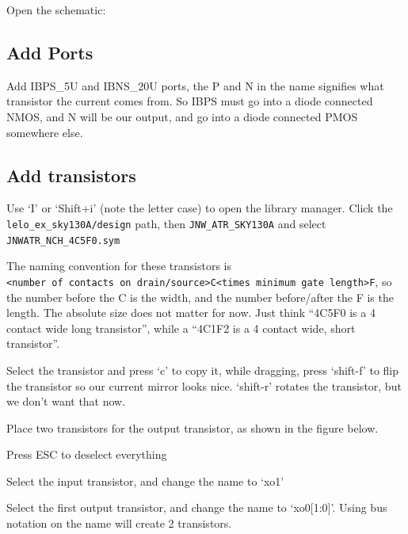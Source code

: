 Open the schematic:

\begin{Shaded}
\begin{Highlighting}[]
 \KeywordTok{\&}
\end{Highlighting}
\end{Shaded}

\subsection{Add Ports}\label{add-ports}

Add IBPS\_5U and IBNS\_20U ports, the P and N in the name signifies what
transistor the current comes from. So IBPS must go into a diode
connected NMOS, and N will be our output, and go into a diode connected
PMOS somewhere else.

\subsection{Add transistors}\label{add-transistors}

Use `I' or `Shift+i' (note the letter case) to open the library manager.
Click the \texttt{lelo\_ex\_sky130A/design} path, then
\texttt{JNW\_ATR\_SKY130A} and select \texttt{JNWATR\_NCH\_4C5F0.sym}

The naming convention for these transistors is
\texttt{\textless{}number\ of\ contacts\ on\ drain/source\textgreater{}C\textless{}times\ minimum\ gate\ length\textgreater{}F},
so the number before the C is the width, and the number before/after the
F is the length. The absolute size does not matter for now. Just think
``4C5F0 is a 4 contact wide long transistor'', while a ``4C1F2 is a 4
contact wide, short transistor''.

Select the transistor and press `c' to copy it, while dragging, press
`shift-f' to flip the transistor so our current mirror looks nice.
`shift-r' rotates the transistor, but we don't want that now.

Place two transistors for the output transistor, as shown in the figure
below.

Press ESC to deselect everything

Select the input transistor, and change the name to `xo1'

Select the first output transistor, and change the name to
`xo0{[}1:0{]}'. Using bus notation on the name will create 2
transistors.

